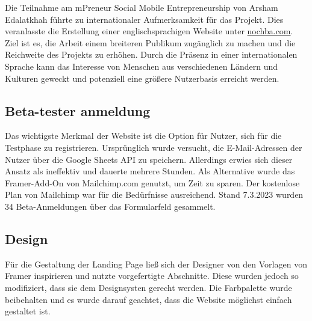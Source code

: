 Die Teilnahme am mPreneur Social Mobile Entrepreneurship von Arsham Edalatkhah führte zu internationaler Aufmerksamkeit für das Projekt. Dies veranlasste die Erstellung einer englischsprachigen Website unter \href{https://nochba.com}{nochba.com}. Ziel ist es, die Arbeit einem breiteren Publikum zugänglich zu machen und die Reichweite des Projekts zu erhöhen. Durch die Präsenz in einer internationalen Sprache kann das Interesse von Menschen aus verschiedenen Ländern und Kulturen geweckt und potenziell eine größere Nutzerbasis erreicht werden.


\subsection{Beta-tester anmeldung}
Das wichtigste Merkmal der Website ist die Option für Nutzer, sich für die Testphase zu registrieren. Ursprünglich wurde versucht, die E-Mail-Adressen der Nutzer über die Google Sheets API zu speichern. Allerdings erwies sich dieser Ansatz als ineffektiv und dauerte mehrere Stunden. Als Alternative wurde das Framer-Add-On von Mailchimp.com genutzt, um Zeit zu sparen. Der kostenlose Plan von Mailchimp war für die Bedürfnisse ausreichend. Stand 7.3.2023 wurden 34 Beta-Anmeldungen über das Formularfeld gesammelt.


\subsection{Design}
Für die Gestaltung der Landing Page ließ sich der Designer
von den Vorlagen von Framer inspirieren und nutzte
vorgefertigte Abschnitte. Diese wurden jedoch so
modifiziert, dass sie dem Designsysten gerecht werden. Die
Farbpalette wurde beibehalten und es wurde darauf geachtet,
dass die Website möglichst einfach gestaltet ist.

